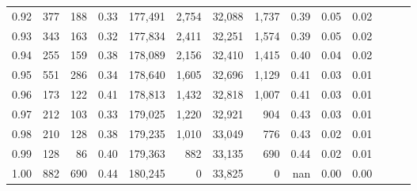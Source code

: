 \begin{tabular}{rrrrrrrrrrrrrr}
0.92 &    377 &  188 &  0.33 &  177,491 &    2,754 &  32,088 &   1,737 &  0.39 &  0.05 &      0.02 \\
0.93 &    343 &  163 &  0.32 &  177,834 &    2,411 &  32,251 &   1,574 &  0.39 &  0.05 &      0.02 \\
0.94 &    255 &  159 &  0.38 &  178,089 &    2,156 &  32,410 &   1,415 &  0.40 &  0.04 &      0.02 \\
0.95 &    551 &  286 &  0.34 &  178,640 &    1,605 &  32,696 &   1,129 &  0.41 &  0.03 &      0.01 \\
0.96 &    173 &  122 &  0.41 &  178,813 &    1,432 &  32,818 &   1,007 &  0.41 &  0.03 &      0.01 \\
0.97 &    212 &  103 &  0.33 &  179,025 &    1,220 &  32,921 &     904 &  0.43 &  0.03 &      0.01 \\
0.98 &    210 &  128 &  0.38 &  179,235 &    1,010 &  33,049 &     776 &  0.43 &  0.02 &      0.01 \\
0.99 &    128 &   86 &  0.40 &  179,363 &      882 &  33,135 &     690 &  0.44 &  0.02 &      0.01 \\
1.00 &    882 &  690 &  0.44 &  180,245 &        0 &  33,825 &       0 &   nan &  0.00 &      0.00 \\
\bottomrule
\end{tabular}

